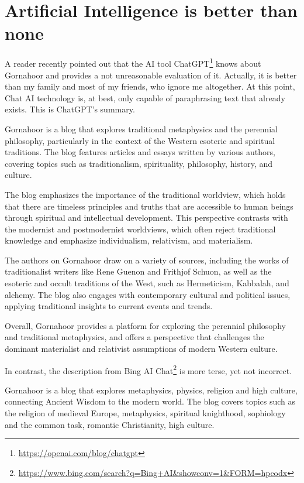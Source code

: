 \section{Artificial Intelligence is better than none}

A reader recently pointed out that the AI tool ChatGPT\footnote{\url{https://openai.com/blog/chatgpt}} knows about Gornahoor and provides a not unreasonable evaluation of it. Actually, it is better than my family and most of my friends, who ignore me altogether. At this point, Chat AI technology is, at best, only capable of paraphrasing text that already exists. This is ChatGPT's summary.

\begin{quotationx}
Gornahoor is a blog that explores traditional metaphysics and the perennial philosophy, particularly in the context of the Western esoteric and spiritual traditions. The blog features articles and essays written by various authors, covering topics such as traditionalism, spirituality, philosophy, history, and culture.

The blog emphasizes the importance of the traditional worldview, which holds that there are timeless principles and truths that are accessible to human beings through spiritual and intellectual development. This perspective contrasts with the modernist and postmodernist worldviews, which often reject traditional knowledge and emphasize individualism, relativism, and materialism.

The authors on Gornahoor draw on a variety of sources, including the works of traditionalist writers like Rene Guenon and Frithjof Schuon, as well as the esoteric and occult traditions of the West, such as Hermeticism, Kabbalah, and alchemy. The blog also engages with contemporary cultural and political issues, applying traditional insights to current events and trends.

Overall, Gornahoor provides a platform for exploring the perennial philosophy and traditional metaphysics, and offers a perspective that challenges the dominant materialist and relativist assumptions of modern Western culture.
\end{quotationx}


In contrast, the description from Bing AI Chat\footnote{\url{https://www.bing.com/search?q=Bing+AI&showconv=1&FORM=hpcodx}} is more terse, yet not incorrect.

\begin{quotex}
Gornahoor is a blog that explores metaphysics, physics, religion and high culture, connecting Ancient Wisdom to the modern world. The blog covers topics such as the religion of medieval Europe, metaphysics, spiritual knighthood, sophiology and the common task, romantic Christianity, high culture.
\end{quotex}




